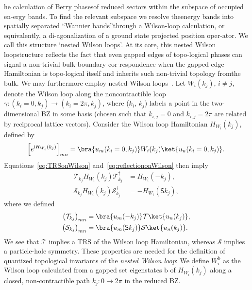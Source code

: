 {he calculation of Berry phasesof  reduced  sectors  within  the  subspace  of  occupied  en-ergy bands.  To find the relevant subspace we resolve theenergy bands into spatially separated “Wannier bands”through a Wilson-loop calculation, or equivalently, a di-agonalization of a ground state projected position oper-ator.   We  call  this  structure  ‘nested  Wilson  loops’.  At its core, this nested Wilson loopstructure reflects the fact that even gapped edges of topo-logical phases can signal a non-trivial bulk-boundary cor-respondence when the gapped edge Hamiltonian is topo-logical itself and inherits such non-trivial topology fromthe bulk. We may furthermore employ nested Wilson loops~\cite{BABHughesBenalcazar17,Benalcazar17}. Let $W_i (k_j)$, $i \neq j$, denote the Wilson loop along the noncontractible loop $\gamma: (k_i = 0, k_j) \rightarrow (k_i = 2\pi, k_j)$, where ($k_i$, $k_j$) labels a point in the two-dimensional BZ in some basis (chosen such that $k_{i,j} = 0$ and $k_{i,j} = 2\pi$ are related by reciprocal lattice vectors). Consider the Wilson loop Hamiltonian $H_{W_i} (k_j)$, defined by
\begin{equation}
\left[e^{\mathrm{i} H_{W_i}(k_j)} \right]_{mn}= \bra{u_m(k_i=0,k_j)} W_i (k_j) \ket{u_n(k_i=0,k_j)}.
\end{equation}
Equations~\eqref{eq:TRSonWilson} and~\eqref{eq:reflectiononWilson} then imply
\begin{equation}
\begin{aligned}
\mathcal{T}_{k_j} H_{W_i} (k_j) \mathcal{T}_{k_j}^\dagger &= H_{W_i} (-k_j), \\
\mathcal{S}_{k_j} H_{W_i} (k_j) \mathcal{S}_{k_j}^\dagger &= - H_{W_i} (\mathsf{S} k_j),
\end{aligned}
\label{eq:nestedWilsonprops}
\end{equation}
where we defined
\begin{equation}
\begin{aligned}
\left(\mathcal{T}_{k_j} \right)_{mn} &= \bra{u_m(-k_j)} \mathcal{T} \ket{u_n(k_j)}, \\
\left(\mathcal{S}_{k_j} \right)_{mn} &= \bra{u_m(\mathsf{S}k_j)} \mathcal{S} \ket{u_n(k_j)}.
\end{aligned}
\end{equation}
We see that $\mathcal{T}$ implies a TRS of the Wilson loop Hamiltonian, whereas $\mathcal{S}$ implies a particle-hole symmetry. These properties are needed for the definition of quantized topological invariants of the \emph{nested Wilson loop}: We define $W_i^\mathrm{b}$ as the Wilson loop calculated from a gapped set eigenstates $\mathrm{b}$ of $H_{W_i} (k_j)$ along a closed, non-contractible path $k_j: 0 \rightarrow 2\pi$ in the reduced BZ.



}
